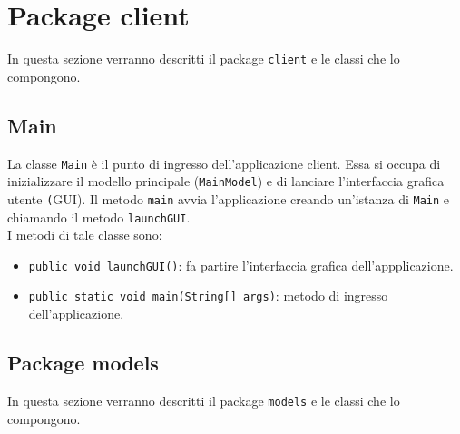 \section{Package client}
In questa sezione verranno descritti il package \texttt{client} e le classi che lo compongono.\\

\subsection{Main}
La classe \texttt{Main} è il punto di ingresso dell'applicazione client.
Essa si occupa di inizializzare il modello principale (\texttt{MainModel}) e di lanciare l'interfaccia grafica utente \texttt(GUI).
Il metodo \texttt{main} avvia l'applicazione creando un'istanza di \texttt{Main} e chiamando il metodo \texttt{launchGUI}.\\
I metodi di tale classe sono:
\begin{itemize}
    \item \texttt{public void launchGUI()}: fa partire l'interfaccia grafica dell'appplicazione.
    \item \texttt{public static void main(String[] args)}: metodo di ingresso dell'applicazione.
\end{itemize}

\subsection{Package models}
In questa sezione verranno descritti il package \texttt{models} e le classi che lo compongono.\\

